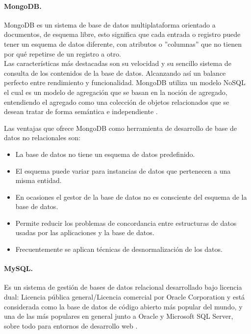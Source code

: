 \documentclass[12pt, a4paper, titlepage]{report}
\begin{document}
            \paragraph{MongoDB. \\}
            MongoDB es un sistema de base de datos multiplataforma orientado a documentos, de esquema libre, esto significa que cada entrada o registro puede tener un esquema de datos diferente, con atributos o ''columnas'' que no tienen por qué repetirse de un registro a otro. \\
            Las características más destacadas son su velocidad y su sencillo sistema de consulta de los contenidos de la base de datos. Alcanzando así un balance perfecto entre rendimiento y funcionalidad. 
            MongoDB utiliza un modelo NoSQL el cual es un modelo de agregación que se basan en la noción de agregado, entendiendo el agregado como una colección de objetos relacionados que se desean tratar de forma semántica e independiente \cite{refMongoDB}.
            
            Las ventajas que ofrece MongoDB como herramienta de desarrollo de base de datos no relacionales son:
            \begin{itemize}
                \item La base de datos no tiene un esquema de datos predefinido.
                \item El esquema puede variar para instancias de datos que pertenecen a una misma entidad.
                \item En ocasiones el gestor de la base de datos no es consciente del esquema de la base de datos.
                \item Permite reducir los problemas de concordancia entre estructuras de datos usadas por las aplicaciones y la base de datos.
                \item Frecuentemente se aplican técnicas de desnormalización de los datos.
            \end{itemize}
                    
            \paragraph{MySQL. \\}
            Es un sistema de gestión de bases de datos relacional desarrollado bajo licencia dual: Licencia pública general/Licencia comercial por Oracle Corporation y está considerada como la base de datos de código abierto más popular del mundo, y una de las más populares en general junto a Oracle y Microsoft SQL Server, sobre todo para entornos de desarrollo web \cite{refmysql}.\\
            
\end{document}
